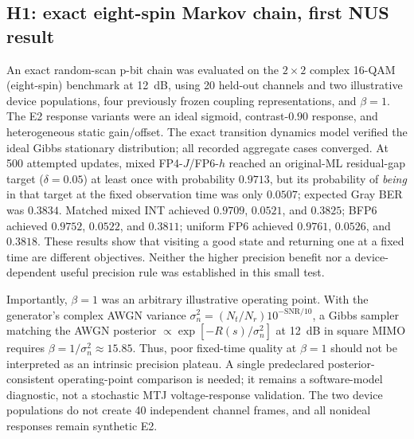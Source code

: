 \documentclass[11pt,a4paper]{article}
\begin{document}
\subsection{H1: exact eight-spin Markov chain, first NUS result}
An exact random-scan p-bit chain was evaluated on the
$2\times2$ complex 16-QAM (eight-spin) benchmark at 12~dB,
using 20 held-out channels and two illustrative device
populations, four previously frozen coupling representations,
and $\beta=1$. The E2 response variants were an ideal sigmoid,
contrast-$0.90$ response, and heterogeneous static gain/offset.
The exact transition dynamics model verified the ideal Gibbs
stationary distribution; all recorded aggregate cases converged.
At 500 attempted updates, mixed FP4-$J$/FP6-$h$ reached
an original-ML residual-gap target ($\delta=0.05$) at least
once with probability $0.9713$, but its probability of
\emph{being} in that target at the fixed observation time
was only $0.0507$; expected Gray BER was $0.3834$.
Matched mixed INT achieved $0.9709$, $0.0521$, and
$0.3825$; BFP6 achieved $0.9752$, $0.0522$, and $0.3811$;
uniform FP6 achieved $0.9761$, $0.0526$, and $0.3818$.
These results show that visiting a good state and returning
one at a fixed time are different objectives. Neither the
higher precision benefit nor a device-dependent useful
precision rule was established in this small test.

Importantly, $\beta=1$ was an arbitrary illustrative
operating point. With the generator's complex AWGN variance
$\sigma_n^2=(N_t/N_r)10^{-\mathrm{SNR}/10}$, a Gibbs sampler
matching the AWGN posterior $\propto\exp[-R(s)/\sigma_n^2]$
at 12~dB in square MIMO requires
$\beta=1/\sigma_n^2\approx15.85$. Thus, poor fixed-time
quality at $\beta=1$ should not be interpreted as an
intrinsic precision plateau. A single predeclared
posterior-consistent operating-point comparison is needed;
it remains a software-model diagnostic, not a stochastic
MTJ voltage-response validation. The two device populations
do not create 40 independent channel frames, and all
nonideal responses remain synthetic E2.
\end{document}

